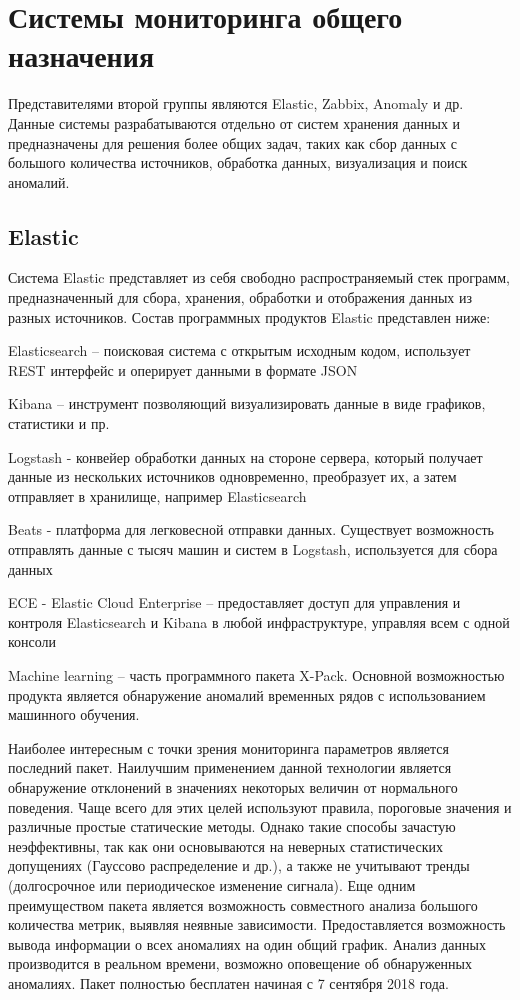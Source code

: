 \section{Системы мониторинга общего назначения}
Представителями второй группы являются Elastic, Zabbix, Anomaly и др. Данные системы разрабатываются отдельно от систем хранения данных и предназначены для решения более общих задач, таких как сбор данных с большого количества источников, обработка данных, визуализация и поиск аномалий. 

\subsection{Elastic}

Система Elastic представляет из себя свободно распространяемый стек программ, предназначенный для сбора, хранения, обработки и отображения данных из разных источников. 
Состав программных продуктов Elastic представлен ниже: 
\begin{itemize*}
	\item{Elasticsearch – поисковая система с открытым исходным кодом, использует REST интерфейс и оперирует данными в формате JSON}
	\item{Kibana – инструмент позволяющий визуализировать данные в виде графиков, статистики и пр.}
	\item{Logstash - конвейер обработки данных на стороне сервера, который получает данные из нескольких источников одновременно, преобразует их, а затем отправляет в хранилище, например Elasticsearch}
	\item{Beats - платформа для легковесной отправки данных. Существует возможность отправлять данные с тысяч машин и систем в Logstash, используется для сбора данных}
	\item{ECE - Elastic Cloud Enterprise – предоставляет доступ для управления и контроля Elasticsearch и Kibana в любой инфраструктуре, управляя всем с одной консоли}
	\item{Machine learning – часть программного пакета X-Pack. Основной возможностью продукта является обнаружение аномалий временных рядов с использованием машинного обучения.}
\end{itemize*}

Наиболее интересным с точки зрения мониторинга параметров является последний пакет. Наилучшим применением данной технологии является обнаружение отклонений в значениях некоторых величин от нормального поведения. Чаще всего для этих целей используют правила, пороговые значения и различные простые статические методы. Однако такие способы зачастую неэффективны, так как они основываются на неверных статистических допущениях (Гауссово распределение и др.), а также не учитывают тренды (долгосрочное или периодическое изменение сигнала). Еще одним преимуществом пакета является возможность совместного анализа большого количества метрик, выявляя неявные зависимости. Предоставляется возможность вывода информации о всех аномалиях на один общий график. Анализ данных производится в реальном времени, возможно оповещение об обнаруженных аномалиях. Пакет полностью бесплатен начиная с 7 сентября 2018 года. 


